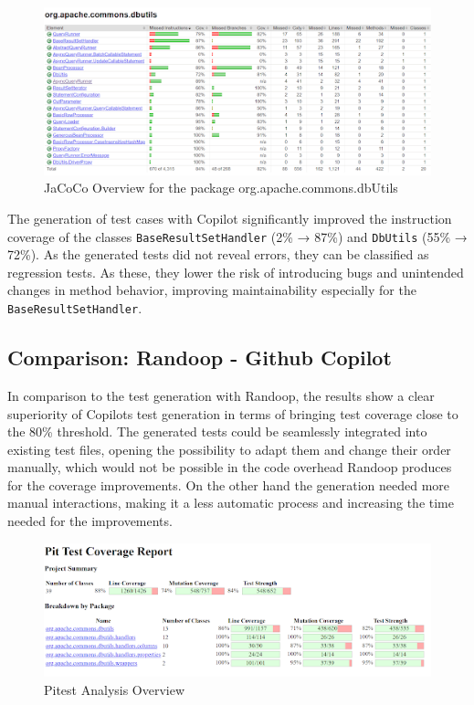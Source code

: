 \documentclass[sigconf]{acmart}
\begin{document}
\begin{figure}[H]
    \centering
    \includegraphics[width=1\linewidth]{images/jacoco4.png}
    \caption{JaCoCo Overview for the package org.apache.commons.dbUtils}
\end{figure}

The generation of test cases with Copilot significantly improved the instruction coverage of the classes \texttt{BaseResultSetHandler} (2\% → 87\%) and \texttt{DbUtils} (55\% → 72\%). As the generated tests did not reveal errors, they can be classified as regression tests. As these, they lower the risk of introducing bugs and unintended changes in method behavior, improving maintainability especially for the \texttt{BaseResultSetHandler}.

\subsection*{Comparison: Randoop - Github Copilot}
In comparison to the test generation with Randoop, the results show a clear superiority of Copilots test generation in terms of bringing test coverage close to the 80\% threshold. The generated tests could be seamlessly integrated into existing test files, opening the possibility to adapt them and change their order manually, which would not be possible in the code overhead Randoop produces for the coverage improvements. On the other hand the generation needed more manual interactions, making it a less automatic process and increasing the time needed for the improvements.

\begin{figure}[H]
    \centering
    \includegraphics[width=1\linewidth]{images/pitest3.png}
    \caption{Pitest Analysis Overview}
\end{figure}
\end{document}
